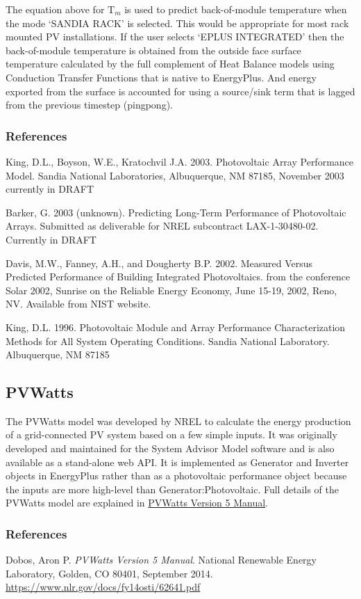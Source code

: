 The equation above for T\(_{m}\) is used to predict back-of-module temperature when the mode `SANDIA RACK' is selected. This would be appropriate for most rack mounted PV installations. If the user selects `EPLUS INTEGRATED' then the back-of-module temperature is obtained from the outside face surface temperature calculated by the full complement of Heat Balance models using Conduction Transfer Functions that is native to EnergyPlus. And energy exported from the surface is accounted for using a source/sink term that is lagged from the previous timestep (pingpong).

\subsubsection{References}\label{references-1-014}

King, D.L., Boyson, W.E., Kratochvil J.A. 2003. Photovoltaic Array Performance Model. Sandia National Laboratories, Albuquerque, NM 87185, November 2003~ currently in DRAFT

Barker, G. 2003 (unknown). Predicting Long-Term Performance of Photovoltaic Arrays. Submitted as deliverable for NREL subcontract LAX-1-30480-02. Currently in DRAFT

Davis, M.W., Fanney, A.H., and Dougherty B.P. 2002. Measured Versus Predicted Performance of Building Integrated Photovoltaics. from the conference Solar 2002, Sunrise on the Reliable Energy Economy, June 15-19, 2002, Reno, NV. Available from NIST website.

King, D.L. 1996. Photovoltaic Module and Array Performance Characterization Methods for All System Operating Conditions. Sandia National Laboratory. Albuquerque, NM 87185

\subsection{PVWatts}\label{pvwattsgenerator}

The PVWatts model was developed by NREL to calculate the energy production of a grid-connected PV system based on a few simple inputs. It was originally developed and maintained for the System Advisor Model software and is also available as a stand-alone web API. It is implemented as Generator and Inverter objects in EnergyPlus rather than as a photovoltaic performance object because the inputs are more high-level than Generator:Photovoltaic. Full details of the PVWatts model are explained in \href{https://www.nlr.gov/docs/fy14osti/62641.pdf}{PVWatts Version 5 Manual}.

\subsubsection{References}\label{references-pvwatts}

Dobos, Aron P. \textit{PVWatts Version 5 Manual}. National Renewable Energy Laboratory, Golden, CO 80401, September 2014. \url{https://www.nlr.gov/docs/fy14osti/62641.pdf}

